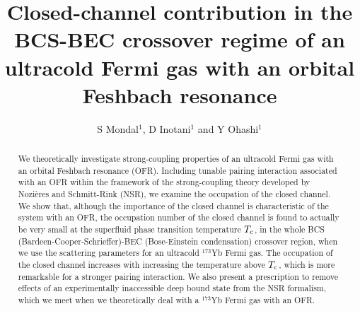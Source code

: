 \documentclass[a4paper]{jpconf}
\begin{document}
\title{Closed-channel contribution in the BCS-BEC crossover regime of an ultracold Fermi gas with an orbital Feshbach resonance}
\author{S Mondal$^1$, D Inotani$^1$ and Y Ohashi$^1$}
\address{Department of Physics, Faculty of Science and Technology, Keio University, 3-14-1 Hiyoshi, Kohoku-ku, Yokohama 223-8522, Japan}
\begin{abstract}
We theoretically investigate strong-coupling properties of an ultracold Fermi gas with an orbital Feshbach resonance (OFR). Including tunable pairing interaction associated with an OFR within the framework of the strong-coupling theory developed by Nozi\`eres and Schmitt-Rink (NSR), we examine the occupation of the closed channel. We show that, although the importance of the closed channel is characteristic of the system with an OFR, the occupation number of the closed channel is found to actually be very small at the superfluid phase transition temperature $T_{\rm c}$, in the whole BCS (Bardeen-Cooper-Schrieffer)-BEC (Bose-Einstein condensation) crossover region, when we use the scattering parameters for an ultracold $^{173}$Yb Fermi gas. The occupation of the closed channel increases with increasing the temperature above $T_{\rm c}$, which is more remarkable for a stronger pairing interaction. We also present a prescription to remove effects of an experimentally inaccessible deep bound state from the NSR formalism, which we meet when we theoretically deal with a $^{173}$Yb Fermi gas with an OFR.
\end{abstract}
\par
\end{document}
